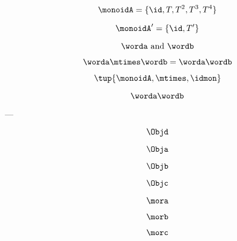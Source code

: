 {\begin{forslides}
        $$\monoidA = \{ \id, T, T^2, T^3, T^4 \}$$
        
        $$\monoidA' = \{ \id, T' \}$$
        
        \begin{equation*}
            \worda \text{ and } \wordb
        \end{equation*}
        
        \begin{equation*}
            \label{eq:string-semigroup-wordab-2}
            \worda \mtimes  \wordb =  \worda \wordb
        \end{equation*}
        
        
        $$ \tup{ \monoidA, \mtimes, \idmon} $$
        
        
        \begin{equation*}
            \label{eq:string-semigroup-wordab-concat-2}
            \worda \wordb
        \end{equation*}
        
        ---
        
        \begin{equation}
            \label{eq:00}
            \Objd
        \end{equation}
        
        \begin{equation}
            \label{eq:01}
            \Obja
        \end{equation}
        
        \begin{equation}
            \label{eq:02}
            \Objb
        \end{equation}
        
        \begin{equation}
            \label{eq:03}
            \Objc
        \end{equation}
        
        \begin{equation}
            \label{eq:04}
            \mora
        \end{equation}
        
        \begin{equation}
            \label{eq:05}
            \morb
        \end{equation}
        
        \begin{equation}
            \label{eq:06}
            \morc
        \end{equation}
        

\end{forslides}}
